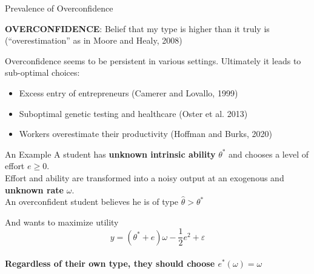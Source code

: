\documentclass[aspectratio=169]{beamer}
\begin{document}

\begin{frame}{Prevalence of Overconfidence}

   \textbf{OVERCONFIDENCE}: Belief that my type is higher than it truly is (``overestimation'' as in Moore and Healy, 2008)\\
    \bigskip
    
    Overconfidence seems to be persistent in various settings. Ultimately it leads to sub-optimal choices:
    \begin{itemize} 
        \item Excess entry of entrepreneurs (Camerer and Lovallo, 1999)
        \item Suboptimal genetic testing and healthcare (Oster et al. 2013)
        \item  Workers overestimate their productivity (Hoffman and Burks, 2020)
    \end{itemize}
 
\end{frame}


\begin{frame}{An Example}
    A student has \textbf{unknown intrinsic ability} $\theta^*$ and chooses a level of effort $e\geq 0$. \\
    \bigskip
    Effort and ability are transformed into a noisy output at an exogenous and \textbf{unknown rate} $\omega.$\\
    \bigskip 
    An overconfident student believes he is of type $\hat\theta>\theta^*$\\
    \bigskip
    
    And wants to maximize utility\\
        $$y = (\theta^* + e)\omega-\frac{1}{2}e^2 +\varepsilon$$\\
    \pause
    \bigskip
   {\textbf{Regardless of their own type, they should choose $e^*(\omega)=\omega$\\}}
\end{frame}


\end{document}
\end{frame}
\end{document}
\end{frame}
\end{document}
